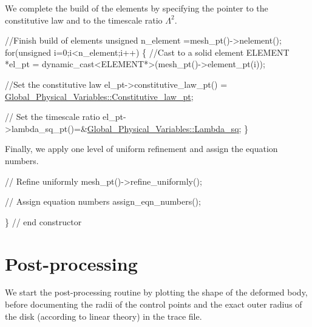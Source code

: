 We complete the build of the elements by specifying the pointer to the constitutive law and to the timescale ratio $ \Lambda^2. $


\begin{DoxyCodeInclude}


 \textcolor{comment}{//Finish build of elements}
 \textcolor{keywordtype}{unsigned} n\_element =mesh\_pt()->nelement();
 \textcolor{keywordflow}{for}(\textcolor{keywordtype}{unsigned} i=0;i<n\_element;i++)
  \{
   \textcolor{comment}{//Cast to a solid element}
   ELEMENT *el\_pt = \textcolor{keyword}{dynamic\_cast<}ELEMENT*\textcolor{keyword}{>}(mesh\_pt()->element\_pt(i));

   \textcolor{comment}{//Set the constitutive law}
   el\_pt->constitutive\_law\_pt() =
    \hyperlink{namespaceGlobal__Physical__Variables_a2a37fb040c832ee7a086bb13bb02a100}{Global\_Physical\_Variables::Constitutive\_law\_pt};
   
   \textcolor{comment}{// Set the timescale ratio}
   el\_pt->lambda\_sq\_pt()=&\hyperlink{namespaceGlobal__Physical__Variables_a6fe17557ceb32dd353827fba60408363}{Global\_Physical\_Variables::Lambda\_sq};
  \}

\end{DoxyCodeInclude}


Finally, we apply one level of uniform refinement and assign the equation numbers.


\begin{DoxyCodeInclude}

 \textcolor{comment}{// Refine uniformly}
 mesh\_pt()->refine\_uniformly();

 \textcolor{comment}{// Assign equation numbers}
 assign\_eqn\_numbers();

\} \textcolor{comment}{// end constructor}

\end{DoxyCodeInclude}




 

\hypertarget{index_doc}{}\section{Post-\/processing}\label{index_doc}
We start the post-\/processing routine by plotting the shape of the deformed body, before documenting the radii of the control points and the exact outer radius of the disk (according to linear theory) in the trace file.

